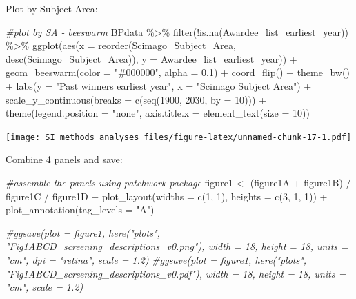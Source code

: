 \documentclass[
]{article}
\newenvironment{Shaded}{\begin{snugshade}}{\end{snugshade}}
\newcommand{\AttributeTok}[1]{\textcolor[rgb]{0.77,0.63,0.00}{#1}}
\newcommand{\CommentTok}[1]{\textcolor[rgb]{0.56,0.35,0.01}{\textit{#1}}}
\newcommand{\DecValTok}[1]{\textcolor[rgb]{0.00,0.00,0.81}{#1}}
\newcommand{\FloatTok}[1]{\textcolor[rgb]{0.00,0.00,0.81}{#1}}
\newcommand{\FunctionTok}[1]{\textcolor[rgb]{0.00,0.00,0.00}{#1}}
\newcommand{\NormalTok}[1]{#1}
\newcommand{\OtherTok}[1]{\textcolor[rgb]{0.56,0.35,0.01}{#1}}
\newcommand{\SpecialCharTok}[1]{\textcolor[rgb]{0.00,0.00,0.00}{#1}}
\newcommand{\StringTok}[1]{\textcolor[rgb]{0.31,0.60,0.02}{#1}}
\begin{document}
Plot by Subject Area:

\begin{Shaded}
\begin{Highlighting}[]
\CommentTok{\#plot by SA {-} beeswarm}
\NormalTok{BPdata }\SpecialCharTok{\%\textgreater{}\%} 
  \FunctionTok{filter}\NormalTok{(}\SpecialCharTok{!}\FunctionTok{is.na}\NormalTok{(Awardee\_list\_earliest\_year)) }\SpecialCharTok{\%\textgreater{}\%}
  \FunctionTok{ggplot}\NormalTok{(}\FunctionTok{aes}\NormalTok{(}\AttributeTok{x =} \FunctionTok{reorder}\NormalTok{(Scimago\_Subject\_Area, }\FunctionTok{desc}\NormalTok{(Scimago\_Subject\_Area)), }\AttributeTok{y =}\NormalTok{ Awardee\_list\_earliest\_year)) }\SpecialCharTok{+} 
  \FunctionTok{geom\_beeswarm}\NormalTok{(}\AttributeTok{color =} \StringTok{"\#000000"}\NormalTok{, }\AttributeTok{alpha =} \FloatTok{0.1}\NormalTok{) }\SpecialCharTok{+}
  \FunctionTok{coord\_flip}\NormalTok{() }\SpecialCharTok{+}
  \FunctionTok{theme\_bw}\NormalTok{() }\SpecialCharTok{+} 
  \FunctionTok{labs}\NormalTok{(}\AttributeTok{y =} \StringTok{"Past winners earliest year"}\NormalTok{, }\AttributeTok{x =} \StringTok{"Scimago Subject Area"}\NormalTok{) }\SpecialCharTok{+} 
  \FunctionTok{scale\_y\_continuous}\NormalTok{(}\AttributeTok{breaks =} \FunctionTok{c}\NormalTok{(}\FunctionTok{seq}\NormalTok{(}\DecValTok{1900}\NormalTok{, }\DecValTok{2030}\NormalTok{, }\AttributeTok{by =} \DecValTok{10}\NormalTok{))) }\SpecialCharTok{+}
  \FunctionTok{theme}\NormalTok{(}\AttributeTok{legend.position =} \StringTok{"none"}\NormalTok{, }\AttributeTok{axis.title.x =} \FunctionTok{element\_text}\NormalTok{(}\AttributeTok{size =} \DecValTok{10}\NormalTok{))}
\end{Highlighting}
\end{Shaded}

\texttt{[image: SI\_methods\_analyses\_files/figure-latex/unnamed-chunk-17-1.pdf]}

Combine 4 panels and save:

\begin{Shaded}
\begin{Highlighting}[]
\CommentTok{\#assemble the panels using patchwork package}
\NormalTok{figure1 }\OtherTok{\textless{}{-}}\NormalTok{ (figure1A }\SpecialCharTok{+}\NormalTok{ figure1B) }\SpecialCharTok{/}\NormalTok{ figure1C }\SpecialCharTok{/}\NormalTok{ figure1D }\SpecialCharTok{+} 
  \FunctionTok{plot\_layout}\NormalTok{(}\AttributeTok{widths =} \FunctionTok{c}\NormalTok{(}\DecValTok{1}\NormalTok{, }\DecValTok{1}\NormalTok{), }\AttributeTok{heights =} \FunctionTok{c}\NormalTok{(}\DecValTok{3}\NormalTok{, }\DecValTok{1}\NormalTok{, }\DecValTok{1}\NormalTok{)) }\SpecialCharTok{+}
  \FunctionTok{plot\_annotation}\NormalTok{(}\AttributeTok{tag\_levels =} \StringTok{"A"}\NormalTok{)}

\CommentTok{\#ggsave(plot = figure1, here("plots", "Fig1ABCD\_screening\_descriptions\_v0.png"), width = 18, height = 18, units = "cm", dpi = "retina", scale = 1.2)}
\CommentTok{\#ggsave(plot = figure1, here("plots", "Fig1ABCD\_screening\_descriptions\_v0.pdf"), width = 18, height = 18, units = "cm", scale = 1.2)}
\end{Highlighting}
\end{Shaded}
\end{document}
